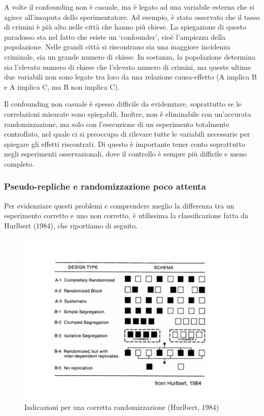 \documentclass[a4paper,12pt,oneside]{book}
\theoremstyle{definition}
\theoremstyle{definition}
\theoremstyle{definition}
\theoremstyle{remark}
\begin{document}
A volte il confounding non è casuale, ma è legato ad una variabile
esterna che si agisce all'insaputa dello sperimentatore. Ad esempio, è
stato osservato che il tasso di crimini è più alto nelle città che hanno
più chiese. La spiegazione di questo paradosso sta nel fatto che esiste
un `confounder', cioè l'ampiezza della popolazione. Nelle grandi città
si riscontrano sia una maggiore incidenza criminale, sia un grande
numero di chiese. In sostanza, la popolazione determina sia l'elevato
numero di chiese che l'elevato numero di crimini, ma queste ultime due
variabili non sono legate tra loro da una relazione causa-effetto (A
implica B e A implica C, ma B non implica C).

Il confounding non casuale è spesso difficile da evidenziare,
soprattutto se le correlazioni misurate sono spiegabili. Inoltre, non è
eliminabile con un'accurata randomizzazione, ma solo con l'esecuzione di
un esperimento totalmente controllato, nel quale ci si preoccupa di
rilevare tutte le variabili necessarie per spiegare gli effetti
riscontrati. Di questo è importante tener conto soprattutto negli
esperimenti osservazionali, dove il controllo è sempre più difficile e
meno completo.

\subsubsection{Pseudo-repliche e randomizzazione poco
attenta}\label{pseudo-repliche-e-randomizzazione-poco-attenta}

Per evidenziare questi problemi e comprendere meglio la differenza tra
un esperimento corretto e uno non corretto, è utilissima la
classificazione fatta da Hurlbert (1984), che riportiamo di seguito.

\begin{figure}

{\centering \includegraphics[width=0.9\linewidth]{_images/Randomisation} 

}

\caption{Indicazioni per una corretta randomizzazione (Hurlbert, 1984)}\label{fig:figName23}
\end{figure}
\end{document}

